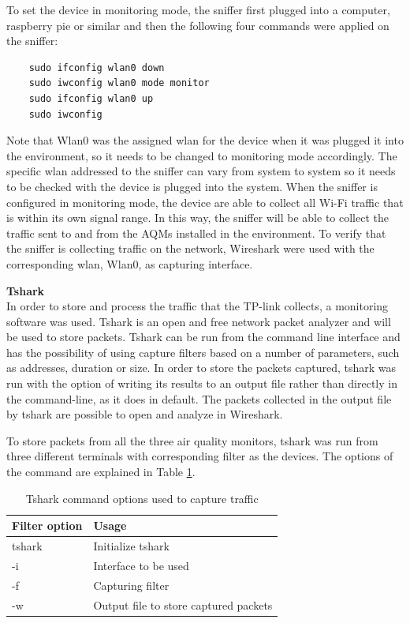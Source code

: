 To set the device in monitoring mode, the sniffer first plugged into a computer, raspberry pie or similar and then the following four commands were applied on the sniffer:

\begin{verbatim}
    sudo ifconfig wlan0 down
    sudo iwconfig wlan0 mode monitor
    sudo ifconfig wlan0 up
    sudo iwconfig
\end{verbatim}

Note that Wlan0 was the assigned wlan for the device when it was plugged it into the environment, so it needs to be changed to monitoring mode accordingly. The specific wlan addressed to the sniffer can vary from system to system so it needs to be checked with the device is plugged into the system. When the sniffer is configured in monitoring mode, the device are able to collect all \gls{Wi-Fi} traffic that is within its own signal range. In this way, the sniffer will be able to collect the traffic sent to and from the \gls{AQM}s installed in the environment. To verify that the sniffer is collecting traffic on the network, Wireshark were used with the corresponding wlan, Wlan0, as capturing interface. 

\textbf{Tshark}\\
In order to store and process the traffic that the TP-link collects, a monitoring software was used. Tshark \cite{Tshark} is an open and free network packet analyzer and will be used to store packets. Tshark can be run from the command line interface and has the possibility of using capture filters based on a number of parameters, such as addresses, duration or size. In order to store the packets captured, tshark was run with the option of writing its results to an output file rather than directly in the command-line, as it does in default. The packets collected in the output file by tshark are possible to open and analyze in Wireshark. 

To store packets from all the three air quality monitors, tshark was run from three different terminals with corresponding filter as the devices. The options of the command are explained in Table \ref{tab:tshark}.

\begin{table}[H]
    \centering
    \caption{Tshark command options used to capture traffic}
    \begin{tabular}{|l|l|}
    \hline
    \textbf{Filter option} & \textbf{Usage}                        \\ \hline
    tshark                 & Initialize tshark                     \\ \hline
    -i                     & Interface to be used                  \\ \hline
    -f                     & Capturing filter                      \\ \hline
    -w                     & Output file to store captured packets \\ \hline
    \end{tabular}
    \label{tab:tshark}
\end{table}

